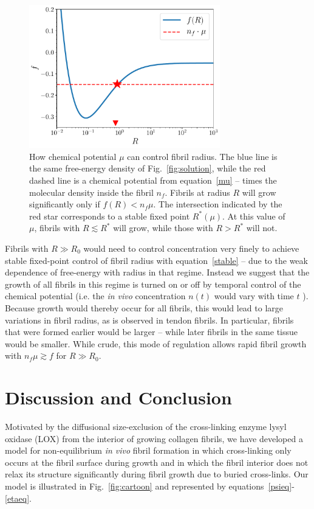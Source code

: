 \documentclass[twoside,twocolumn,9pt]{article}
\begin{document}
\begin{figure}[t!] %
\centering
  \includegraphics[width=8.3cm]{figure5.pdf}
  \caption{How chemical potential $\mu$ can control fibril radius. The blue line is the same free-energy density of Fig.~\ref{fig:solution}, while the red dashed line is a chemical potential from equation~\ref{mu} -- times the molecular density inside the fibril $n_f$. Fibrils at radius $R$ will grow significantly only if $f(R)< n_f \mu$. The intersection indicated by the red star corresponds to a stable fixed point $R^\ast(\mu)$. At this value of $\mu$, fibrils with $R \lesssim R^\ast$ will grow, while those with $R > R^\ast$ will not.\cite{ratchet}}
  \label{fig:radius_control}
\end{figure}

Fibrils with $R \gg R_0$ would need to control concentration very finely to achieve stable fixed-point control of fibril radius with equation~\ref{stable} -- due to the weak dependence of free-energy with radius in that regime. Instead we suggest that the growth of all fibrils in this regime is turned on or off by temporal control of the chemical potential (i.e. the \emph{in vivo} concentration $n(t)$ would vary with time $t$ ). Because growth would thereby occur for all fibrils, this would lead to large variations in fibril radius, as is observed in tendon fibrils.  In particular, fibrils that were formed earlier would be larger -- while later fibrils in the same tissue would be smaller. While crude, this mode of regulation allows rapid fibril growth with $n_f \mu \gtrsim f$ for $R \gg R_0$. 

\section{Discussion and Conclusion} 
Motivated by the diffusional size-exclusion of the cross-linking enzyme lysyl oxidase (LOX) from the interior of growing collagen fibrils, we have developed a model for non-equilibrium \textit{in vivo} fibril formation in which cross-linking only occurs at the fibril surface during growth and in which the fibril interior does not relax its structure significantly during fibril growth due to buried cross-links. Our model is  illustrated in Fig.~\ref{fig:cartoon} and represented by equations~\ref{psieq}-\ref{etaeq}.
\end{document}
